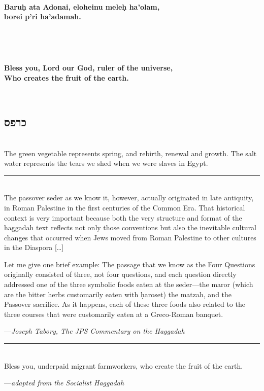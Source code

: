 \documentclass[a4paper,10pt,openany]{memoir}
\newcommand{\HgInst}[1]{{\noindent\sffamily{\bfseries{#1}}}}
\newcommand{\HgSource}[1]{\hfill{\small---\itshape{#1}}}
\newcommand{\hchapter}[1]{
  \begin{otherlanguage}{hebrew}
    \chapter*{#1}
  \end{otherlanguage}
}
\newcommand{\HgHL}[1]{{\Large\bfseries#1\par\noindent\\[-.5em]}}
\newcommand{\HgFill}{\vfill \hrule \vfill}
\newenvironment{HgEnglish}{\strut\\\noindent}{\vspace{1em}}
\newenvironment{HgTranslit}{\strut\\\noindent\begin{itshape}}{\end{itshape}\vspace{1em}}
\begin{document}
\begin{HgTranslit}
  \HgHL{
  Baru\d{h} ata Adonai, eloheinu mele\d{h} ha'olam, \\
  borei p'ri ha'adamah.
}
\end{HgTranslit}
\vspace{-1em}
\begin{HgEnglish}
  \HgHL{
  Bless you, Lord our God, ruler of the universe, \\
  Who creates the fruit of the earth.
  }
\end{HgEnglish}

\HgInst{Eat the parsely.}

\vfill

\hchapter{כרפס}

\begin{HgEnglish}
The green vegetable represents spring, and rebirth, renewal and growth. The salt
water represents the tears we shed when we were slaves in Egypt.
\end{HgEnglish}

\HgFill

\begin{HgEnglish}
  The passover seder as we know it, however, actually originated in late
  antiquity, in Roman Palestine in the first centuries of the Common Era. That
  historical context is very important because both the very structure and
  format of the haggadah text reflects not only those conventions but also the
  inevitable cultural changes that occurred when Jews moved from Roman Palestine
  to other cultures in the Diaspora [\ldots]

  Let me give one brief example: The passage that we know as the Four
  Questions originally consisted of three, not four questions, and each question
  directly addressed one of the three symbolic foods eaten at the seder---the
  maror (which are the bitter herbs customarily eaten with \d{h}aroset) the
  matzah, and the Passover sacrifice. As it happens, each of these three foods
  also related to the three courses that were customarily eaten at a Greco-Roman
  banquet.

  \HgSource{Joseph Tabory, The JPS Commentary on the Haggadah}
\end{HgEnglish}

\HgFill

\begin{HgEnglish}
  Bless you, underpaid migrant farmworkers, who create the fruit of the earth.

  \HgSource{adapted from the Socialist Haggadah}
\end{HgEnglish}
\end{document}
